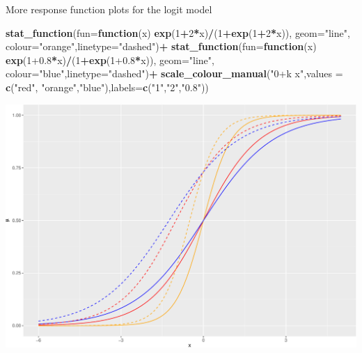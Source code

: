 \documentclass[
  ignorenonframetext,
]{beamer}
\newenvironment{Shaded}{\begin{snugshade}}{\end{snugshade}}
\newcommand{\AttributeTok}[1]{\textcolor[rgb]{0.13,0.29,0.53}{#1}}
\newcommand{\ControlFlowTok}[1]{\textcolor[rgb]{0.13,0.29,0.53}{\textbf{#1}}}
\newcommand{\DecValTok}[1]{\textcolor[rgb]{0.00,0.00,0.81}{#1}}
\newcommand{\FloatTok}[1]{\textcolor[rgb]{0.00,0.00,0.81}{#1}}
\newcommand{\FunctionTok}[1]{\textcolor[rgb]{0.13,0.29,0.53}{\textbf{#1}}}
\newcommand{\NormalTok}[1]{#1}
\newcommand{\SpecialCharTok}[1]{\textcolor[rgb]{0.81,0.36,0.00}{\textbf{#1}}}
\newcommand{\StringTok}[1]{\textcolor[rgb]{0.31,0.60,0.02}{#1}}
\begin{document}
\begin{frame}[fragile]
\begin{block}{More response function plots for the logit model}
\begin{Shaded}
\begin{Highlighting}[]
    \FunctionTok{stat\_function}\NormalTok{(}\AttributeTok{fun=}\ControlFlowTok{function}\NormalTok{(x) }\FunctionTok{exp}\NormalTok{(}\DecValTok{1}\SpecialCharTok{+}\DecValTok{2}\SpecialCharTok{*}\NormalTok{x)}\SpecialCharTok{/}\NormalTok{(}\DecValTok{1}\SpecialCharTok{+}\FunctionTok{exp}\NormalTok{(}\DecValTok{1}\SpecialCharTok{+}\DecValTok{2}\SpecialCharTok{*}\NormalTok{x)), }\AttributeTok{geom=}\StringTok{"line"}\NormalTok{, }\AttributeTok{colour=}\StringTok{"orange"}\NormalTok{,}\AttributeTok{linetype=}\StringTok{"dashed"}\NormalTok{)}\SpecialCharTok{+}
          \FunctionTok{stat\_function}\NormalTok{(}\AttributeTok{fun=}\ControlFlowTok{function}\NormalTok{(x) }\FunctionTok{exp}\NormalTok{(}\DecValTok{1}\FloatTok{+0.8}\SpecialCharTok{*}\NormalTok{x)}\SpecialCharTok{/}\NormalTok{(}\DecValTok{1}\SpecialCharTok{+}\FunctionTok{exp}\NormalTok{(}\DecValTok{1}\FloatTok{+0.8}\SpecialCharTok{*}\NormalTok{x)), }\AttributeTok{geom=}\StringTok{"line"}\NormalTok{, }\AttributeTok{colour=}\StringTok{"blue"}\NormalTok{,}\AttributeTok{linetype=}\StringTok{"dashed"}\NormalTok{)}\SpecialCharTok{+}
  \FunctionTok{scale\_colour\_manual}\NormalTok{(}\StringTok{"0+k x"}\NormalTok{,}\AttributeTok{values =} \FunctionTok{c}\NormalTok{(}\StringTok{"red"}\NormalTok{, }\StringTok{"orange"}\NormalTok{,}\StringTok{"blue"}\NormalTok{),}\AttributeTok{labels=}\FunctionTok{c}\NormalTok{(}\StringTok{"1"}\NormalTok{,}\StringTok{"2"}\NormalTok{,}\StringTok{"0.8"}\NormalTok{))}
\end{Highlighting}
\end{Shaded}

\includegraphics{3BinRegPresentation_files/figure-beamer/unnamed-chunk-12-1.pdf}
\end{block}
\end{frame}
\end{document}
